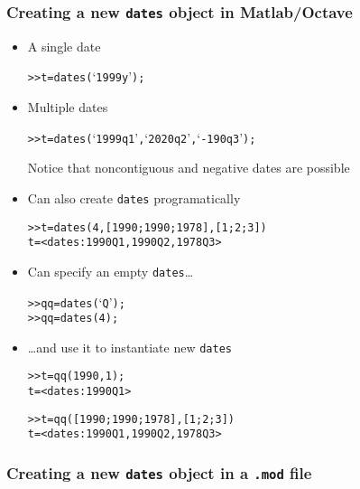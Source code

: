 \documentclass[10pt]{beamer}
\newcommand{\myitem}{\item[$\bullet$]}
\begin{document}
\begin{frame}[fragile,t]
  \frametitle{Creating a new \texttt{dates} object in Matlab/Octave}
  \begin{itemize}
    \myitem{A single date}
\begin{alltt}
  >> t = dates(`1999y');
\end{alltt}
    \myitem{Multiple dates}
\begin{alltt}
  >> t = dates(`1999q1', `2020q2', `-190q3');
\end{alltt}
Notice that noncontiguous and negative dates are possible
    \myitem Can also create \texttt{dates} programatically
\begin{alltt}
  >> t = dates(4, [1990; 1990; 1978], [1; 2; 3])
  t = <dates: 1990Q1, 1990Q2, 1978Q3>
\end{alltt}
    \myitem Can specify an empty \texttt{dates}\dots
\begin{alltt}
  >> qq = dates(`Q');
  >> qq = dates(4);
\end{alltt}
    \myitem \dots and use it to instantiate new \texttt{dates}
\begin{alltt}
  >> t = qq(1990, 1);
  t = <dates: 1990Q1>
\end{alltt}
\begin{alltt}
  >> t = qq([1990; 1990; 1978], [1; 2; 3])
  t = <dates: 1990Q1, 1990Q2, 1978Q3>
\end{alltt}
  \end{itemize}
\end{frame}



\begin{frame}[fragile,t]
  \frametitle{Creating a new \texttt{dates} object in a \texttt{.mod} file}
\end{frame}
\end{document}
